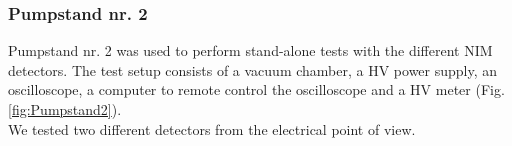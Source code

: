 	

		\pagebreak
		\subsubsection{Pumpstand nr. 2}\label{subsubsec:SetFacPumpst}
		

		
		
		Pumpstand nr. 2 was used to perform stand-alone tests with the different NIM detectors. The test setup consists of a vacuum chamber, a HV power supply, an oscilloscope, a computer to remote control the oscilloscope and a HV meter (Fig. \ref{fig:Pumpstand2}).\\
		We tested two different detectors from the electrical point of view.
		
